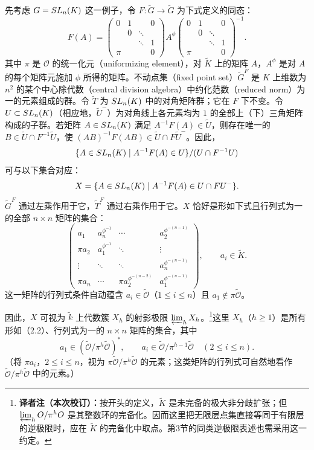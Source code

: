 先考虑 $\widetilde G=\SL_n(\widetilde K)$ 这一例子，令 $F:\widetilde G\to\widetilde G$ 为下式定义的同态：
\[
F(A)=\begin{pmatrix}
0&1&&0\\
&0&\ddots&\\
&&\ddots&1\\
\pi&&&0
\end{pmatrix}A^\phi
\begin{pmatrix}
0&1&&0\\
&0&\ddots&\\
&&\ddots&1\\
\pi&&&0
\end{pmatrix}^{-1}.
\tag{2.1}
\]
其中 $\pi$ 是 $\mathcal O$ 的统一化元（uniformizing element），对 $\widetilde K$ 上的矩阵 $A$，$A^\phi$ 是对 $A$ 的每个矩阵元施加 $\phi$ 所得的矩阵。不动点集（fixed point set）$\widetilde G^F$ 是 $K$ 上维数为 $n^2$ 的某个中心除代数（central division algebra）中约化范数（reduced norm）为一的元素组成的群。令 $\widetilde T$ 为 $\SL_n(\widetilde K)$ 中的对角矩阵群；它在 $F$ 下不变。令 $\widetilde U\subset\SL_n(\widetilde K)$（相应地，$\widetilde U^-$）为对角线上各元素均为 $1$ 的全部上（下）三角矩阵构成的子群。若矩阵 $A\in\SL_n(\widetilde K)$ 满足 $A^{-1}F(A)\in\widetilde U$，则存在唯一的 $B\in\widetilde U\cap F^{-1}\widetilde U$，使 $(AB)^{-1}F(AB)\in\widetilde U\cap F\widetilde U^-$。因此，
\[
\{A\in\SL_n(\widetilde K)\mid A^{-1}F(A)\in\widetilde U\}/(\widetilde U\cap F^{-1}\widetilde U)
\]
可与以下集合对应：
\[
X=\{A\in\SL_n(\widetilde K)\mid A^{-1}F(A)\in\widetilde U\cap F\widetilde U^-\}.
\]
$\widetilde G^F$ 通过左乘作用于它，$\widetilde T^F$ 通过右乘作用于它。$X$ 恰好是形如下式且行列式为一的全部 $n\times n$ 矩阵的集合：
\[
\begin{pmatrix}
a_1&a_n^{\phi^{-1}}&\cdots&a_2^{\phi^{-(n-1)}}\\
\pi a_2&a_1^{\phi^{-1}}&\ddots&\vdots\\
\vdots&\ddots&\ddots&a_n^{\phi^{-(n-1)}}\\
\pi a_n&\cdots&\pi a_2^{\phi^{-(n-2)}}&a_1^{\phi^{-(n-1)}}
\end{pmatrix},\qquad a_i\in\widetilde K.
\tag{2.2}
\]
这一矩阵的行列式条件自动蕴含 $a_i\in\widetilde{\mathcal O}$（$1\leq i\leq n$）且 $a_1\notin\pi\widetilde{\mathcal O}$。

因此，$X$ 可视为 $\widetilde k$ 上代数簇 $X_h$ 的射影极限 $\varprojlim_hX_h$。\footnote{\textbf{译者注（本次校订）：}按开头的定义，$\widetilde K$ 是未完备的极大非分歧扩张；但 $\varprojlim_h\widetilde{\mathcal O}/\pi^h\widetilde{\mathcal O}$ 是其整数环的完备化。因而这里把无限层点集直接等同于有限层的逆极限时，应在 $\widetilde K$ 的完备化中取点。第3节的同类逆极限表述也需采用这一约定。}这里 $X_h$（$h\geq1$）是所有形如（2.2）、行列式为一的 $n\times n$ 矩阵的集合，其中
\[
a_1\in(\widetilde{\mathcal O}/\pi^h\widetilde{\mathcal O})^*,\qquad
a_i\in\widetilde{\mathcal O}/\pi^{h-1}\widetilde{\mathcal O}\quad(2\leq i\leq n).
\]
（将 $\pi a_i$，$2\leq i\leq n$，视为 $\pi\widetilde{\mathcal O}/\pi^h\widetilde{\mathcal O}$ 的元素；这类矩阵的行列式可自然地看作 $\widetilde{\mathcal O}/\pi^h\widetilde{\mathcal O}$ 中的元素。）

